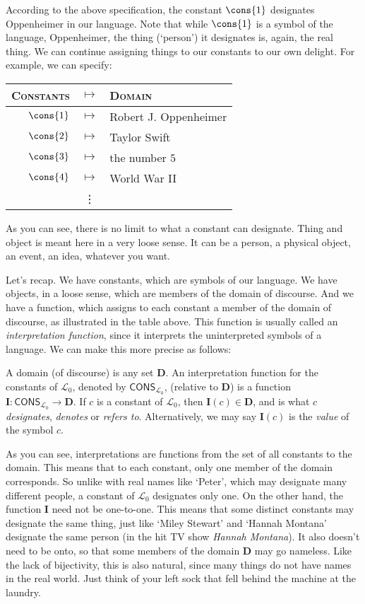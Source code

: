 According to the above specification, the constant $\cons{1}$ designates Oppenheimer in our language. Note that while $\cons{1}$ is a symbol of the language, Oppenheimer, the thing (`person') it designates is, again, the real thing. We can continue assigning things to our constants to our own delight. For example, we can specify:
\begin{center}
	\begin{tabular}{rcl}
		\textsc{Constants} & $\mapsto$ & \textsc{Domain}\\\hline
		$\cons{1}$ & $\mapsto$ & Robert J. Oppenheimer\\
		$\cons{2}$ & $\mapsto$ & Taylor Swift\\
		$\cons{3}$ & $\mapsto$ & the number $5$\\
		$\cons{4}$ & $\mapsto$ & World War II\\
		& \vdots & 
	\end{tabular}
\end{center}

As you can see, there is no limit to what a constant can designate. Thing and object is meant here in a very loose sense. It can be a person, a physical object, an event, an idea, whatever you want. 

Let's recap. We have constants, which are symbols of our language. We have objects, in a loose sense, which are members of the domain of discourse. And we have a function, which assigns to each constant a member of the domain of discourse, as illustrated in the table above. This function is usually called an \textit{interpretation function}, since it interprets the uninterpreted symbols of a language. We can make this more precise as follows:

\begin{defn}
A domain (of discourse) is any set $\mathbf{D}$. An interpretation function for the constants of $\mathcal{L}_0$, denoted by $\mathsf{CONS}_{\mathcal{L}_0}$, (relative to $\mathbf{D}$) is a function $\mathbf{I}: \mathsf{CONS}_{\mathcal{L}_0} \to \mathbf{D}$. If $c$ is a constant of $\mathcal{L}_0$, then $\mathbf{I}(c) \in \mathbf{D}$, and is what $c$ \textit{designates}, \textit{denotes} or \textit{refers to}. Alternatively, we may say $\mathbf{I}(c)$ is the \textit{value} of the symbol $c$. 
\end{defn}

As you can see, interpretations are functions from the set of all constants to the domain. This means that to each constant, only one member of the domain corresponds. So unlike with real names like `Peter', which may designate many different people, a constant of $\mathcal{L}_0$ designates only one. On the other hand, the function $\mathbf{I}$ need not be one-to-one. This means that some distinct constants may designate the same thing, just like `Miley Stewart' and `Hannah Montana' designate the same person (in the hit TV show \textit{Hannah Montana}). It also doesn't need to be onto, so that some members of the domain $\mathbf{D}$ may go nameless. Like the lack of bijectivity, this is also natural, since many things do not have names in the real world. Just think of your left sock that fell behind the machine at the laundry. 

